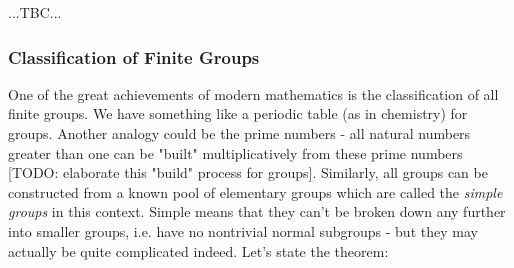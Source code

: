 
...TBC...





\subsubsection{Classification of Finite Groups}
One of the great achievements of modern mathematics is the classification of all finite groups. We have something like a periodic table (as in chemistry) for groups. Another analogy could be the prime numbers - all natural numbers greater than one can be "built" multiplicatively from these prime numbers [TODO: elaborate this "build" process for groups]. Similarly, all groups can be constructed from a known pool of elementary groups which are called the \emph{simple groups} in this context. Simple means that they can't be broken down any further into smaller groups, i.e. have no nontrivial normal subgroups - but they may actually be quite complicated indeed. Let's state the theorem:

